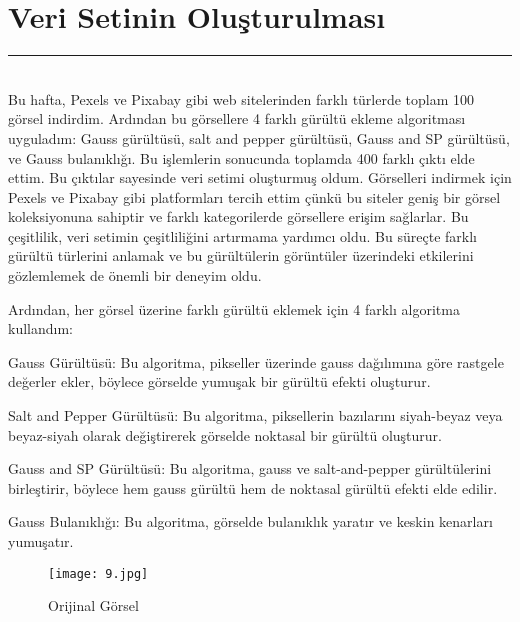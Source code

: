 \documentclass{article}
\begin{document}
\section{Veri Setinin Oluşturulması}
\rule{\textwidth}{0.5pt}\\[10pt]

 \noindent Bu hafta, Pexels\cite{Pexels} ve Pixabay\cite{Pixabay} gibi web sitelerinden farklı türlerde toplam 100 görsel indirdim. Ardından bu görsellere 4 farklı gürültü ekleme algoritması uyguladım: Gauss gürültüsü, salt and pepper gürültüsü, Gauss and SP gürültüsü, ve Gauss bulanıklığı. Bu işlemlerin sonucunda toplamda 400 farklı çıktı elde ettim. Bu çıktılar sayesinde veri setimi oluşturmuş oldum. Görselleri indirmek için Pexels ve Pixabay gibi platformları tercih ettim çünkü bu siteler geniş bir görsel koleksiyonuna sahiptir ve farklı kategorilerde görsellere erişim sağlarlar. Bu çeşitlilik, veri setimin çeşitliliğini artırmama yardımcı oldu. Bu süreçte farklı gürültü türlerini anlamak ve bu gürültülerin görüntüler üzerindeki etkilerini gözlemlemek de önemli bir deneyim oldu.\vspace{0,5cm}

\noindent Ardından, her görsel üzerine farklı gürültü eklemek için 4 farklı algoritma kullandım:\vspace{0,5cm}

\noindent Gauss Gürültüsü: Bu algoritma\cite{Github}, pikseller üzerinde gauss dağılımına göre rastgele değerler ekler, böylece görselde yumuşak bir gürültü efekti oluşturur.\vspace{0,5cm}

\noindent Salt and Pepper Gürültüsü: Bu algoritma\cite{Github2}, piksellerin bazılarını siyah-beyaz veya beyaz-siyah olarak değiştirerek görselde noktasal bir gürültü oluşturur.\vspace{0,5cm}

\noindent Gauss and SP Gürültüsü: Bu algoritma, gauss ve salt-and-pepper gürültülerini birleştirir, böylece hem gauss gürültü hem de noktasal gürültü efekti elde edilir.\vspace{0,5cm}

\noindent Gauss Bulanıklığı: Bu algoritma\cite{OpenCV}, görselde bulanıklık yaratır ve keskin kenarları yumuşatır.\vspace{0,5cm}

\begin{figure}
     \centering
 \noindent \texttt{[image: 9.jpg]}\centering 
  \caption{Orijinal Görsel}
  \label{fig:resim_etiketi}
\end{figure}
\end{document}
